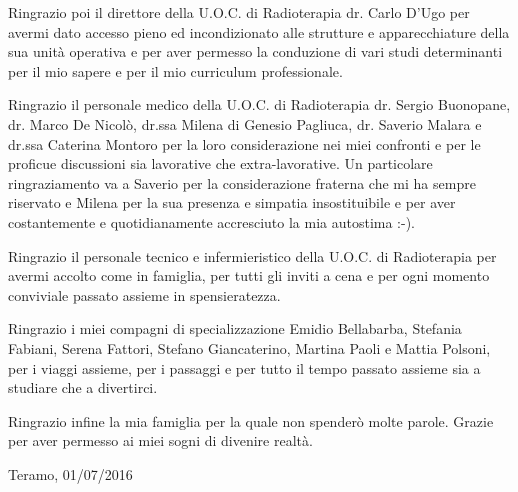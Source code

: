\vspace*{2ex}

Ringrazio poi il direttore della U.O.C. di Radioterapia dr. Carlo D'Ugo per avermi dato accesso pieno ed incondizionato alle strutture e apparecchiature della sua unità operativa e per aver permesso la conduzione di vari studi determinanti per il mio sapere e per il mio curriculum professionale.

\vspace*{2ex}

Ringrazio il personale medico della U.O.C. di Radioterapia dr. Sergio Buonopane, dr. Marco De Nicolò, dr.ssa Milena di Genesio Pagliuca, dr. Saverio Malara e dr.ssa Caterina Montoro per la loro considerazione nei miei confronti e per le proficue discussioni sia lavorative che extra-lavorative. Un particolare ringraziamento va a Saverio per la considerazione fraterna che mi ha sempre riservato e Milena per la sua presenza e simpatia insostituibile e per aver costantemente e quotidianamente accresciuto la mia autostima :-).

\vspace*{2ex}

Ringrazio il personale tecnico e infermieristico della U.O.C. di Radioterapia per avermi accolto come in famiglia, per tutti gli inviti a cena e per ogni momento conviviale passato assieme in spensieratezza.

\vspace*{2ex}

Ringrazio i miei compagni di specializzazione Emidio Bellabarba, Stefania Fabiani, Serena Fattori, Stefano Giancaterino, Martina Paoli e Mattia Polsoni, per i viaggi assieme, per i passaggi e per tutto il tempo passato assieme sia a studiare che a divertirci.

\vspace*{2ex}

Ringrazio infine la mia famiglia per la quale non spenderò molte parole. Grazie per aver permesso ai miei sogni di divenire realtà.

\vspace*{2ex}
Teramo, 01/07/2016






 
